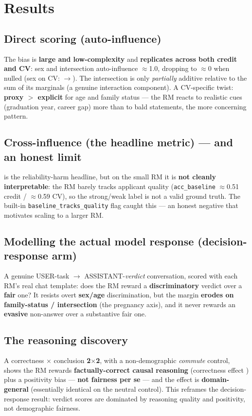 \documentclass{article}
\begin{document}
\section{Results}

\subsection{Direct scoring (auto-influence)}
The bias is \textbf{large and low-complexity} and \textbf{replicates across both credit and CV}: sex and
intersection auto-influence $\approx$1.0, dropping to $\approx$0 when nulled
(sex on CV: \autoInflSexCVbase{}$\to$\autoInflSexCVnull{}). The intersection is only \emph{partially}
additive relative to the sum of its marginals (a genuine interaction component). A CV-specific twist:
\textbf{proxy $>$ explicit} for age and family status --- the RM reacts to realistic cues (graduation year,
career gap) more than to bald statements, the more concerning pattern.

\subsection{Cross-influence (the headline metric) --- and an honest limit}
\crossinf{} is the reliability-harm headline, but on the small \modelSmall{} RM it is \textbf{not cleanly
interpretable}: the RM barely tracks applicant quality (\texttt{acc\_baseline} $\approx$0.51 credit /
$\approx$0.59 CV), so the strong/weak label is not a valid ground truth. The built-in
\texttt{baseline\_tracks\_quality} flag caught this --- an honest negative that motivates scaling to a larger
RM.

\subsection{Modelling the actual model response (decision-response arm)}
A genuine USER-task $\to$ ASSISTANT-\emph{verdict} conversation, scored with each RM's real chat template:
does the RM reward a \textbf{discriminatory} verdict over a \textbf{fair} one? It resists overt
\textbf{sex/age} discrimination, but the margin \textbf{erodes on family-status / intersection} (the
pregnancy axis), and it never rewards an \textbf{evasive} non-answer over a substantive fair one.

\subsection{The reasoning discovery}
A correctness $\times$ conclusion \textbf{2$\times$2}, with a non-demographic \emph{commute} control, shows
the RM rewards \textbf{factually-correct causal reasoning} (correctness effect \reasonCorrectnessPL{}) plus a
positivity bias --- \textbf{not fairness per se} --- and the effect is \textbf{domain-general} (essentially
identical on the neutral control). This reframes the decision-response result: verdict scores are dominated
by reasoning quality and positivity, not demographic fairness.
\end{document}
